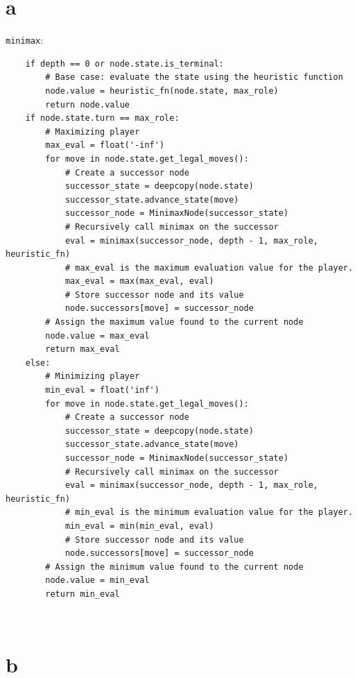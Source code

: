 \documentclass[12pt]{article}
\begin{document}
\subsection{} 
\begin{enumerate}

\part{a} \texttt{minimax}:

	\begin{lstlisting}
	if depth == 0 or node.state.is_terminal:
        # Base case: evaluate the state using the heuristic function
        node.value = heuristic_fn(node.state, max_role)
        return node.value
    if node.state.turn == max_role:
        # Maximizing player
        max_eval = float('-inf')
        for move in node.state.get_legal_moves():
            # Create a successor node
            successor_state = deepcopy(node.state)
            successor_state.advance_state(move)
            successor_node = MinimaxNode(successor_state)
            # Recursively call minimax on the successor
            eval = minimax(successor_node, depth - 1, max_role, heuristic_fn)
            # max_eval is the maximum evaluation value for the player.
            max_eval = max(max_eval, eval)
            # Store successor node and its value
            node.successors[move] = successor_node
        # Assign the maximum value found to the current node
        node.value = max_eval
        return max_eval
    else:
        # Minimizing player
        min_eval = float('inf')
        for move in node.state.get_legal_moves():
            # Create a successor node
            successor_state = deepcopy(node.state)
            successor_state.advance_state(move)
            successor_node = MinimaxNode(successor_state)
            # Recursively call minimax on the successor
            eval = minimax(successor_node, depth - 1, max_role, heuristic_fn)
            # min_eval is the minimum evaluation value for the player.
            min_eval = min(min_eval, eval)
            # Store successor node and its value
            node.successors[move] = successor_node
        # Assign the minimum value found to the current node
        node.value = min_eval
        return min_eval
	\end{lstlisting}\
	
\part{b} 
	

\end{enumerate}
\end{document}
